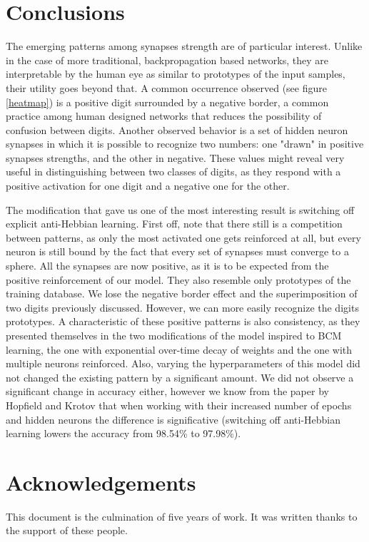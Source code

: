 \documentclass[a4paper]{report}
\begin{document}
\chapter{Conclusions}

The emerging patterns among synapses strength are of particular interest.
Unlike in the case of more traditional, backpropagation based networks, they are interpretable by the human eye as similar to prototypes of the input samples, their utility goes beyond that.
A common occurrence observed (see figure \ref{heatmap}) is a positive digit surrounded by a negative border, a common practice among human designed networks that reduces the possibility of confusion between digits.
Another observed behavior is a set of hidden neuron synapses in which it is possible to recognize two numbers:
one "drawn" in positive synapses strengths, and the other in negative.
These values might reveal very useful in distinguishing between two classes of digits, as they respond with a positive activation for one digit and a negative one for the other.

The modification that gave us one of the most interesting result is switching off explicit anti-Hebbian learning.
First off, note that there still is a competition between patterns, as only the most activated one gets reinforced at all, but every neuron is still bound by the fact that every set of synapses must converge to a sphere.
All the synapses are now positive, as it is to be expected from the positive reinforcement of our model.
They also resemble only prototypes of the training database.
We lose the negative border effect and the superimposition of two digits previously discussed.
However, we can more easily recognize the digits prototypes.
A characteristic of these positive patterns is also consistency, as they presented themselves in the two modifications of the model inspired to BCM learning, the one with exponential over-time decay of weights and the one with multiple neurons reinforced.
Also, varying the hyperparameters of this model did not changed the existing pattern by a significant amount.
We did not observe a significant change in accuracy either, however we know from the paper by Hopfield and Krotov that when working with their increased number of epochs and hidden neurons the difference is significative (switching off anti-Hebbian learning lowers the accuracy from 98.54\% to 97.98\%).

\chapter{Acknowledgements}
This document is the culmination of five years of work.
It was written thanks to the support of these people.
\end{document}
